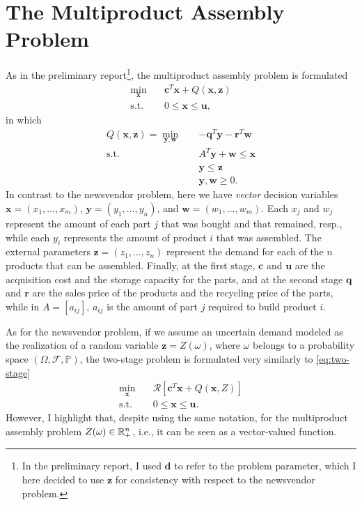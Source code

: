 \documentclass[12pt]{article}
\begin{document}
\section*{The Multiproduct Assembly Problem}

As in the preliminary report\footnote{In the preliminary report, I used $\bm{d}$ to refer to the problem parameter, which I here decided to use $\bm{z}$ for consistency with respect to the newsvendor problem.}, the multiproduct assembly problem is formulated
\begin{align*}
    \min_{\bm{x}} \quad & \bm{c}^{T} \bm{x} + Q(\bm{x}, \bm{z}) \\
    \textrm{s.t.} \quad & 0 \le \bm{x} \le \bm{u}
,\end{align*}
in which
\begin{align*}
    Q(\bm{x},\bm{z}) = \min_{\bm{y},\bm{w}} \quad & -\bm{q}^{T} \bm{y} - \bm{r}^{T}\bm{w} \\
    \textrm{s.t.} \quad & A^{T}\bm{y} + \bm{w} \le \bm{x} \\
      & \bm{y} \le \bm{z} \\
      & \bm{y}, \bm{w} \ge 0
.\end{align*}
In contrast to the newsvendor problem, here we have \emph{vector} decision variables $\bm{x}=(x_1,\ldots,x_m)$, $\bm{y}=(y_1,\ldots,y_{n})$, and $\bm{w}=(w_1,\ldots,w_m)$.
Each $x_{j}$ and $w_j$ represent the amount of each part $j$ that was bought and that remained, resp., while each $y_{i}$ represents the amount of product $i$ that was assembled.
The external parameters $\bm{z}=(z_1,\ldots,z_n)$ represent the demand for each of the $n$ products that can be assembled.
Finally, at the first stage,  $\bm{c}$ and $\bm{u}$ are the acquisition cost and the storage capacity for the parts, and at the second stage $\bm{q}$ and $\bm{r}$ are the sales price of the products and the recycling price of the parts, while in $A=[a_{ij}]$, $a_{ij}$ is the amount of part $j$ required to build product $i$.

As for the newsvendor problem, if we assume an uncertain demand modeled as the realization of a random variable $\bm{z} = Z(\omega)$, where $\omega$ belongs to a probability space $\left( \Omega, \mathcal{F}, \mathbb{P} \right)$, the two-stage problem is formulated very similarly to \eqref{eq:two-stage}
\begin{equation}\label{eq:two-stage-ndim}
\begin{split}
    \min_{\bm{x}} \quad & \mathcal{R}[\bm{c}^{T}\bm{x} + Q(\bm{x},Z)] \\
    \textrm{s.t.} \quad & 0\le \bm{x}\le \bm{u}
.\end{split}
\end{equation}
However, I highlight that, despite using the same notation, for the multiproduct assembly problem $Z(\omega)\in \mathbb{R}^{n}_{+}$, i.e., it can be seen as a vector-valued function.
\end{document}

